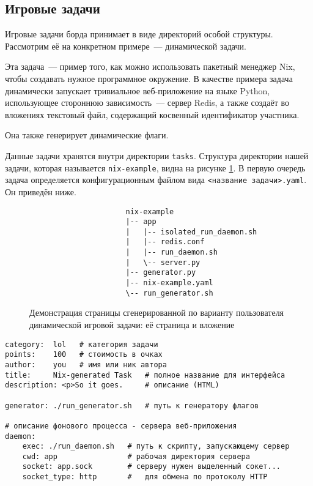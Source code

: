 \subsection{Игровые задачи}

Игровые задачи борда принимает в виде директорий особой структуры. Рассмотрим её на конкретном примере~--- динамической задачи.

Эта задача~--- пример того, как можно использовать пакетный менеджер Nix, чтобы создавать нужное программное окружение. В качестве примера задача динамически запускает тривиальное веб-приложение на языке Python, использующее стороннюю зависимость~--- сервер Redis, а также создаёт во вложениях текстовый файл, содержащий косвенный идентификатор участника.

Она также генерирует динамические флаги.

Данные задачи хранятся внутри директории \texttt{tasks}. Структура директории нашей задачи, которая называется \texttt{nix-example}, видна на рисунке \ref{fig:tree}. В первую очередь задача определяется конфигурационным файлом вида \texttt{<название задачи>.yaml}. Он приведён ниже.

\begin{figure}[hb!]
  \centering
  \begin{verbatim}
                      nix-example
                      |-- app
                      |   |-- isolated_run_daemon.sh
                      |   |-- redis.conf
                      |   |-- run_daemon.sh
                      |   \-- server.py
                      |-- generator.py
                      |-- nix-example.yaml
                      \-- run_generator.sh
  \end{verbatim}
  \caption{Демонстрация страницы сгенерированной по варианту пользователя динамической игровой задачи: её страница и вложение}
  \label{fig:tree}
\end{figure}

\begin{lstlisting}[caption={Конфигурационный файл задачи \texttt{nix-example}}]
category:  lol   # категория задачи
points:    100   # стоимость в очках
author:    you   # имя или ник автора
title:     Nix-generated Task   # полное название для интерфейса
description: <p>So it goes.     # описание (HTML)

generator: ./run_generator.sh   # путь к генератору флагов

# описание фонового процесса - сервера веб-приложения
daemon:
    exec: ./run_daemon.sh   # путь к скрипту, запускающему сервер
    cwd: app                # рабочая директория сервера
    socket: app.sock        # серверу нужен выделенный сокет...
    socket_type: http       #   для обмена по протоколу HTTP
\end{lstlisting}

